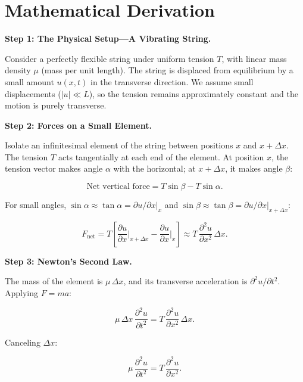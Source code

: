 \section*{Mathematical Derivation}

\textbf{Step 1: The Physical Setup---A Vibrating String.}

Consider a perfectly flexible string under uniform tension $T$, with linear mass density $\mu$ (mass per unit length). The string is displaced from equilibrium by a small amount $u(x,t)$ in the transverse direction. We assume small displacements ($|u| \ll L$), so the tension remains approximately constant and the motion is purely transverse.

\textbf{Step 2: Forces on a Small Element.}

Isolate an infinitesimal element of the string between positions $x$ and $x + \Delta x$. The tension $T$ acts tangentially at each end of the element. At position $x$, the tension vector makes angle $\alpha$ with the horizontal; at $x + \Delta x$, it makes angle $\beta$:

\begin{equation}
\text{Net vertical force} = T\sin\beta - T\sin\alpha.
\end{equation}

For small angles, $\sin\alpha \approx \tan\alpha = \partial u/\partial x\big|_x$ and $\sin\beta \approx \tan\beta = \partial u/\partial x\big|_{x+\Delta x}$:

\begin{equation}
F_{\text{net}} = T\left[\frac{\partial u}{\partial x}\bigg|_{x+\Delta x} - \frac{\partial u}{\partial x}\bigg|_x\right] \approx T\,\frac{\partial^2 u}{\partial x^2}\,\Delta x.
\end{equation}

\textbf{Step 3: Newton's Second Law.}

The mass of the element is $\mu\,\Delta x$, and its transverse acceleration is $\partial^2 u/\partial t^2$. Applying $F = ma$:

\begin{equation}
\mu\,\Delta x\,\frac{\partial^2 u}{\partial t^2} = T\,\frac{\partial^2 u}{\partial x^2}\,\Delta x.
\end{equation}

Canceling $\Delta x$:

\begin{equation}
\mu\,\frac{\partial^2 u}{\partial t^2} = T\,\frac{\partial^2 u}{\partial x^2}.
\end{equation}

